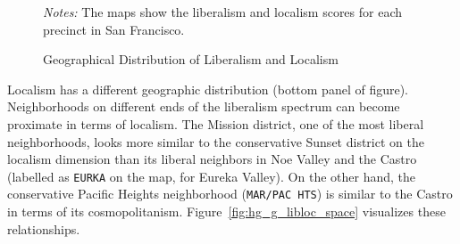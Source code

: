 \documentclass[article,12pt]{memoir}
\begin{document}
\begin{figure}\centering
  \caption{Geographical Distribution of Liberalism and Localism}
  \label{fig:hg_g_pc_map}
  \begin{measuredfigure}
  \end{measuredfigure}
  \begin{tablenotes}[flushleft]
    \item \hspace{-.2em}\emph{Notes:} The maps show the liberalism and localism scores for each precinct in San Francisco.
  \end{tablenotes}
\end{figure}

Localism has a different geographic distribution (bottom panel of figure).  Neighborhoods on different ends of the liberalism spectrum can become proximate in terms of localism.  The Mission district, one of the most liberal neighborhoods, looks more similar to the conservative Sunset district on the localism dimension than its liberal neighbors in Noe Valley and the Castro (labelled as \texttt{EURKA} on the map, for Eureka Valley).  On the other hand, the conservative Pacific Heights neighborhood (\texttt{MAR/PAC HTS}) is similar to the Castro in terms of its cosmopolitanism. Figure~\ref{fig:hg_g_libloc_space} visualizes these relationships.
\end{document}
